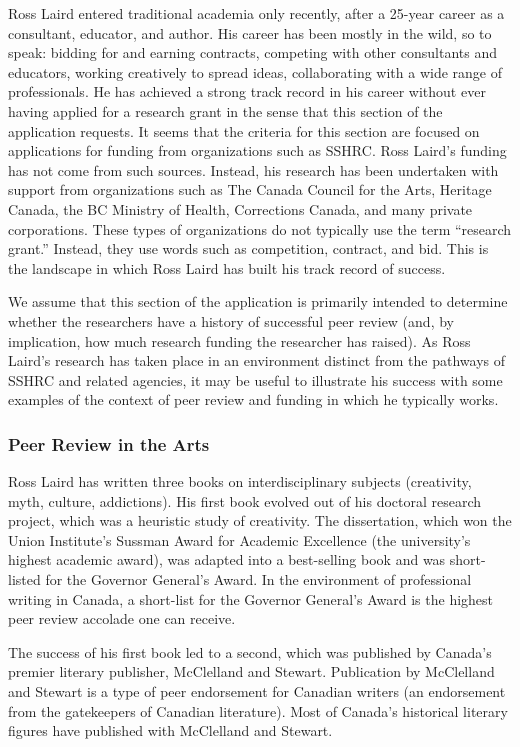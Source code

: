 \documentclass[letterpaper,10pt,headsepline]{scrreprt}
\begin{document}
Ross Laird entered traditional academia only recently, after a 25-year career
as a consultant, educator, and author. His career has been mostly in the wild,
so to speak: bidding for and earning contracts, competing with other
consultants and educators, working creatively to spread ideas, collaborating
with a wide range of professionals. He has achieved a strong track record in
his career without ever having applied for a research grant in the sense that
this section of the application requests. It seems that the criteria for this
section are focused on applications for funding from organizations such as
SSHRC. Ross Laird's funding has not come from such sources. Instead, his
research has been undertaken with support from organizations such as The
Canada Council for the Arts, Heritage Canada, the BC Ministry of Health,
Corrections Canada, and many private corporations. These types of
organizations do not typically use the term ``research grant.'' Instead, they
use words such as competition, contract, and bid. This is the landscape in
which Ross Laird has built his track record of success.

We assume that this section of the application is primarily intended to
determine whether the researchers have a history of successful peer review
(and, by implication, how much research funding the researcher has raised). As
Ross Laird's research has taken place in an environment distinct from the
pathways of SSHRC and related agencies, it may be useful to illustrate his
success with some examples of the context of peer review and funding in which
he typically works.

\subsubsection{Peer Review in the Arts}

Ross Laird has written three books on interdisciplinary subjects (creativity,
myth, culture, addictions). His first book evolved out of his doctoral
research project, which was a heuristic study of creativity. The dissertation,
which won the Union Institute's Sussman Award for Academic Excellence (the
university's highest academic award), was adapted into a best-selling book and
was short-listed for the Governor General's Award. In the environment of
professional writing in Canada, a short-list for the Governor General's Award
is the highest peer review accolade one can receive.

The success of his first book led to a second, which was published by Canada's
premier literary publisher, McClelland and Stewart. Publication by McClelland
and Stewart is a type of peer endorsement for Canadian writers (an endorsement
from the gatekeepers of Canadian literature). Most of Canada's historical
literary figures have published with McClelland and Stewart.
\end{document}
